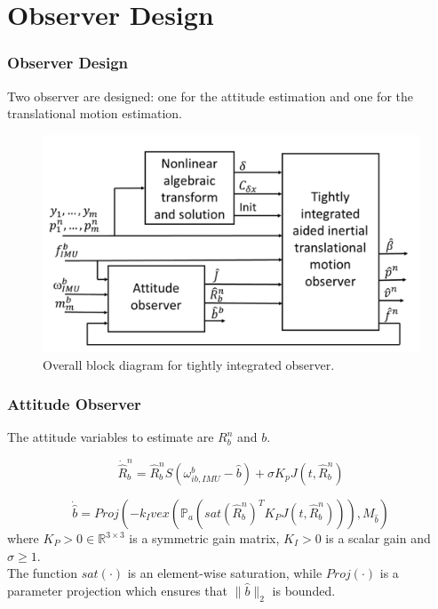\documentclass{beamer}
\begin{document}
\section{Observer Design}
	\begin{frame}
	\frametitle{Observer Design}
	Two observer are designed: one for the attitude estimation and one for the translational motion estimation. 
		\begin{figure}[H]
		\centering
		\includegraphics[scale=0.3]{observers}
		\caption{Overall block diagram for tightly integrated observer.}
	\end{figure}
	\end{frame}

	\begin{frame}
		\frametitle{Attitude Observer}
		The attitude variables to estimate are $R^n_b$ and $b$.
		
		\[ \dot{\hat{R}}^n_b  =  \hat{R}^n_b S(\omega^b_{ib,IMU} - \hat{b}) + \sigma K_pJ(t, \hat{R}^n_b)       \]
		
		\[ \dot{\hat{b}} = Proj(-k_I vex(\mathds{P}_a (sat(\hat{R}^n_b)^T K_P J(t, \hat{R}^n_b))),M_{\hat{b}} )           \]\newline
		where $K_P > 0 \in \mathds{R}^{3\times 3}$ is a symmetric gain matrix, $K_I > 0$ is a scalar gain and $\sigma \geq 1$.\\ 
		
		The function $sat(\cdot)$ is an element-wise saturation, while $Proj(\cdot)$ is a parameter projection which ensures that $\|\hat{b} \|_2$ is bounded.
	\end{frame}
\end{document}
